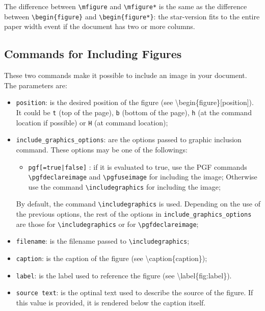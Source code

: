 \documentclass[book,taskpackage,specpackage,codepackage]{upmethodology-document}
\begin{document}
The difference between \texttt{{\textbackslash}mfigure} and \texttt{{\textbackslash}mfigure*} is the same as the difference between \texttt{{\textbackslash}begin\{figure\}} and \texttt{{\textbackslash}begin\{figure*\}}: the star-version fits to the entire paper width event if the document has two or more columns.

\subsection{Commands for Including Figures}

These two commands make it possible to include an image in your document. The parameters are:
\begin{itemize}
\item \texttt{position}: is the desired position of the figure (see {\textbackslash}begin\{figure\}[position]). It could be \texttt{t} (top of the page), \texttt{b} (bottom of the page), \texttt{h} (at the command location if possible) or \texttt{H} (at command location);

\item \texttt{include\_graphics\_options}: are the options passed to graphic inclusion command.
	These options may be one of the followings:
	\begin{itemize}
	\item \texttt{pgf[=true|false]} : if it is evaluated to true, use the PGF commands \texttt{{\textbackslash}pgfdeclareimage} and \texttt{{\textbackslash}pgfuseimage} for including the image; Otherwise use the command \texttt{{\textbackslash}includegraphics} for including the image;
	\end{itemize}
	By default, the command \texttt{{\textbackslash}includegraphics} is used.
	Depending on the use of the previous options, the rest of the options in \texttt{include\_graphics\_options} are those for \texttt{{\textbackslash}includegraphics} or for \texttt{{\textbackslash}pgfdeclareimage};

\item \texttt{filename}: is the filename passed to \texttt{{\textbackslash}includegraphics};

\item \texttt{caption}: is the caption of the figure (see {\textbackslash}caption\{caption\});

\item \texttt{label}: is the label used to reference the figure (see {\textbackslash}label\{fig:label\}).

\item \texttt{source text}: is the optinal text used to describe the source of the figure. If this value is provided, it is rendered below the caption itself.
\end{itemize}
\end{document}
